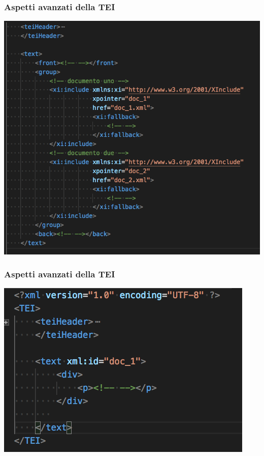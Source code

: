     \begin{frame}
        \frametitle{Aspetti avanzati della TEI}
        \addtocounter{nframe}{1}
        
            \begin{center}
                \includegraphics[width=.8\textwidth]{imgs/xinclude.png}
            \end{center}
        
    \end{frame}
    \begin{frame}
        \frametitle{Aspetti avanzati della TEI}
        \addtocounter{nframe}{1}
        
            \begin{center}
                \includegraphics[width=.95\textwidth]{imgs/doc_1.png}
            \end{center}
        
    \end{frame}
